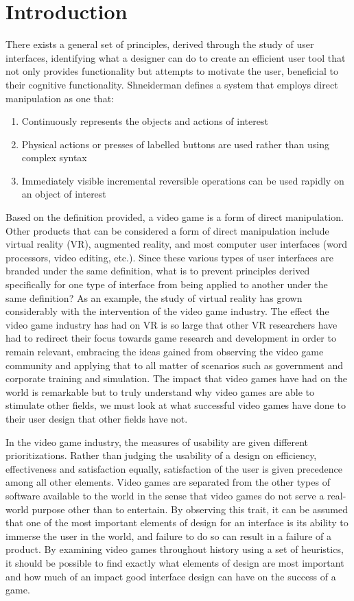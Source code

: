 \documentclass[12pt]{report}
\begin{document}
\section{Introduction}
There exists a general set of principles, derived through the study of user interfaces, identifying what a designer can do to create an efficient user tool that not only provides functionality but attempts to motivate the user, beneficial to their cognitive functionality. Shneiderman defines a system that employs direct manipulation as one that\cite{Shneiderman}:
\begin{enumerate}
\item Continuously represents the objects and actions of interest
\item Physical actions or presses of labelled buttons are used rather than using complex syntax
\item Immediately visible incremental reversible operations can be used rapidly on an object of interest
\end{enumerate}
Based on the definition provided, a video game is a form of direct manipulation. Other products that can be considered a form of direct manipulation include virtual reality (VR), augmented reality, and most computer user interfaces (word processors, video editing, etc.). Since these various types of user interfaces are branded under the same definition, what is to prevent principles derived specifically for one type of interface from being applied to another under the same definition? As an example, the study of virtual reality has grown considerably with the intervention of the video game industry. The effect the video game industry has had on VR is so large that other VR researchers have had to redirect their focus towards game research and development in order to remain relevant, embracing the ideas gained from observing the video game community and applying that to all matter of scenarios such as government and corporate training and simulation\cite{Zyda}. The impact that video games have had on the world is remarkable but to truly understand why video games are able to stimulate other fields, we must look at what successful video games have done to their user design that other fields have not.

In the video game industry, the measures of usability are given different prioritizations. Rather than judging the usability of a design on efficiency, effectiveness and satisfaction equally, satisfaction of the user is given precedence among all other elements\cite{Federoff}. Video games are separated from the other types of software available to the world in the sense that video games do not serve a real-world purpose other than to entertain\cite{Federoff}. By observing this trait, it can be assumed that one of the most important elements of design for an interface is its ability to immerse the user in the world, and failure to do so can result in a failure of a product. By examining video games throughout history using a set of heuristics, it should be possible to find exactly what elements of design are most important and how much of an impact good interface design can have on the success of a game.
\end{document}
